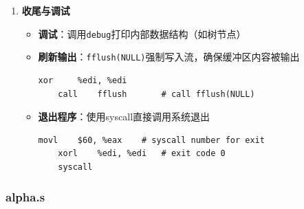 \documentclass[10pt,a4paper]{article}
\begin{document}
\begin{enumerate}
    \item \textbf{收尾与调试}
    \begin{itemize}
        \item \textbf{调试}：调用\verb|debug|打印内部数据结构（如树节点）
        \item \textbf{刷新输出}：\verb|fflush(NULL)|强制写入流，确保缓冲区内容被输出
        \begin{lstlisting}[language={[x86masm]Assembler}]
    xor     %edi, %edi
    call    fflush       # call fflush(NULL)
        \end{lstlisting}
        \item \textbf{退出程序}：使用syscall直接调用系统退出
        \begin{lstlisting}[language={[x86masm]Assembler}]
    movl    $60, %eax    # syscall number for exit
    xorl    %edi, %edi   # exit code 0
    syscall
        \end{lstlisting}
    \end{itemize}
\end{enumerate}

\subsubsection{alpha.s}
\end{document}
